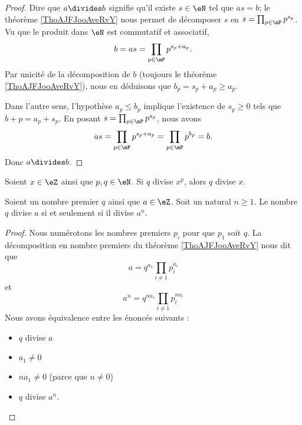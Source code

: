 \begin{proof}
    Dire que \( a\divides b\) signifie qu'il existe \( s\in \eN\) tel que \( as=b\); le théorème \ref{ThoAJFJooAveRvY} nous permet de décomposer \( s\) en \( s=\prod_{p\in\mP}p^{s_p}\). Vu que le produit dans \( \eN\) est commutatif et associatif,
    \begin{equation}
        b=as=\prod_{p\in\mP}p^{s_p+a_p}.
    \end{equation}
    Par unicité de la décomposition de \( b\) (toujours le théorème \ref{ThoAJFJooAveRvY}), nous en déduisons que \( b_p=s_p+a_p\geq a_p\).

    Dans l'autre sens, l'hypothèse \( a_p\leq b_p\) implique l'existence de \( s_p\geq 0\) tels que \( b+p=a_p+s_p\). En posant \( s=\prod_{p\in\mP}p^{s_p}\), nous avons
    \begin{equation}
        as=\prod_{p\in\mP}p^{s_p+a_p}=\prod_{p\in \mP}p^{b_p}=b.
    \end{equation}
    Donc \( a\divides b\).
\end{proof}

\begin{proposition}     \label{PROPooBKQNooFglPGI}
    Soient \( x\in \eZ\) ainsi que \( p,q\in \eN\). Si \( q\) divise \( x^p\), alors \( q\) divise \( x\).
\end{proposition}

\begin{lemma}       \label{LEMooGLZHooUcRNgu}
    Soient un nombre premier \( q\) ainsi que \( a\in \eZ\). Soit un natural \( n\geq 1\). Le nombre \( q\) divise \( a\) si et seulement si il divise \( a^n\).
\end{lemma}

\begin{proof}
    Nous numérotons les nombres premiers \( p_i\) pour que \( p_1\) soit \( q\). La décomposition en nombre premiers du théorème \ref{ThoAJFJooAveRvY} nous dit que
    \begin{equation}
        a=q^{a_1}\prod_{i\neq 1}p_i^{a_i}
    \end{equation}
    et
    \begin{equation}
        a^n=q^{na_1}\prod_{i\neq 1}p_i^{na_i}
    \end{equation}
    Nous avons équivalence entre les énoncés suivants :
    \begin{itemize}
        \item \( q\) divise \( a\)
        \item \( a_1\neq 0\)
        \item \( na_1\neq 0\) (parce que \( n\neq 0\))
        \item \( q\) divise \( a^n\).
    \end{itemize}
\end{proof}

